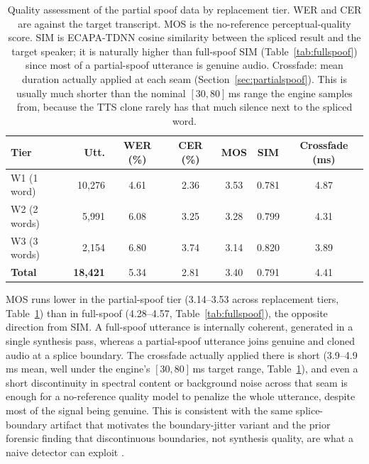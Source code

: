 \documentclass[11pt]{report}
\begin{document}
\begin{table}[H]
\centering
\caption{Quality assessment of the partial spoof data by replacement tier. WER and CER are against the target
transcript. MOS is the no-reference perceptual-quality score. SIM is
ECAPA-TDNN cosine similarity between the spliced result and the target
speaker; it is naturally higher than full-spoof SIM (Table~\ref{tab:fullspoof})
since most of a partial-spoof utterance is genuine audio. Crossfade: mean duration actually applied at each seam
(Section~\ref{sec:partialspoof}). This is usually much shorter than
the nominal $[30,80]$\,ms range the engine samples from, because the
TTS clone rarely has that much silence next to the spliced word.}
\label{tab:pstierquality}
\small
\begin{tabular}{lrccccc}
\toprule
\textbf{Tier} & \textbf{Utt.} & \textbf{WER (\%)} & \textbf{CER (\%)} & \textbf{MOS} & \textbf{SIM} & \textbf{Crossfade (ms)} \\
\midrule
W1 (1 word)  & 10{,}276 & 4.61 & 2.36 & 3.53 & 0.781 & 4.87 \\
W2 (2 words) &  5{,}991 & 6.08 & 3.25 & 3.28 & 0.799 & 4.31 \\
W3 (3 words) &  2{,}154 & 6.80 & 3.74 & 3.14 & 0.820 & 3.89 \\
\midrule
\textbf{Total} & \textbf{18{,}421} & 5.34 & 2.81 & 3.40 & 0.791 & 4.41 \\
\bottomrule
\end{tabular}
\end{table}

MOS runs lower in the partial-spoof tier (3.14--3.53 across
replacement tiers, Table~\ref{tab:pstierquality}) than in full-spoof
(4.28--4.57, Table~\ref{tab:fullspoof}), the opposite direction from
SIM. A full-spoof utterance is internally coherent, generated in a
single synthesis pass, whereas a partial-spoof utterance joins genuine
and cloned audio at a splice boundary. The crossfade actually applied
there is short (3.9--4.9\,ms mean, well under the engine's
$[30,80]$\,ms target range, Table~\ref{tab:pstierquality}), and even a
short discontinuity in spectral content or background noise across
that seam is enough for a no-reference quality model to penalize the
whole utterance, despite most of the signal being genuine. This is
consistent with the same splice-boundary artifact that motivates the
boundary-jitter variant and the prior forensic finding that
discontinuous boundaries, not synthesis quality, are what a naive
detector can exploit \citep{negroni2024splicing,huang2024detectable}.
\end{document}
